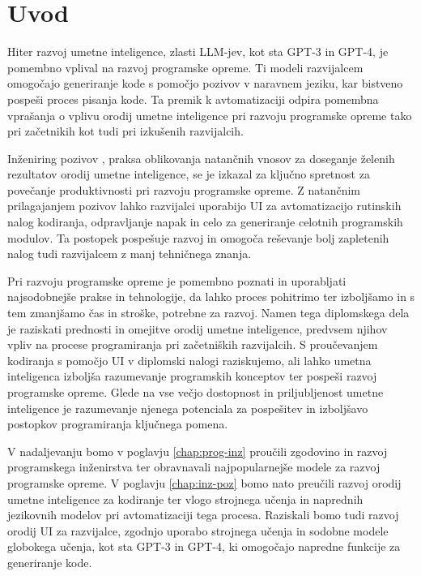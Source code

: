 \documentclass[a4paper,12pt,openright]{book}
\begin{document}
\chapter{Uvod}

Hiter razvoj umetne inteligence, zlasti LLM-jev, kot sta GPT-3 in GPT-4, je pomembno vplival na razvoj programske opreme. Ti modeli razvijalcem omogočajo generiranje kode s pomočjo pozivov v naravnem jeziku, kar bistveno pospeši proces pisanja kode. Ta premik k avtomatizaciji odpira pomembna vprašanja o vplivu orodij umetne inteligence pri razvoju programske opreme tako pri začetnikih kot tudi pri izkušenih razvijalcih.


Inženiring pozivov \cite{baidoo2023education}, praksa oblikovanja natančnih vnosov za doseganje želenih rezultatov orodij umetne inteligence, se je izkazal za ključno spretnost za povečanje produktivnosti pri razvoju programske opreme. Z natančnim prilagajanjem pozivov lahko razvijalci uporabijo UI za avtomatizacijo rutinskih nalog kodiranja, odpravljanje napak in celo za generiranje celotnih programskih modulov. Ta postopek pospešuje razvoj in omogoča reševanje bolj zapletenih nalog tudi razvijalcem z manj tehničnega znanja.

Pri razvoju programske opreme je pomembno poznati in uporabljati najsodobnejše prakse in tehnologije, da lahko proces pohitrimo ter izboljšamo in s tem zmanjšamo čas in stroške, potrebne za razvoj.
Namen tega diplomskega dela je raziskati prednosti in omejitve orodij umetne inteligence, predvsem njihov vpliv na procese programiranja  pri začetniških razvijalcih. S proučevanjem kodiranja s pomočjo UI v diplomski nalogi raziskujemo, ali lahko umetna inteligenca izboljša razumevanje programskih konceptov ter pospeši razvoj programske opreme. Glede na vse večjo dostopnost in priljubljenost umetne inteligence je razumevanje njenega potenciala za pospešitev in izboljšavo postopkov programiranja ključnega pomena.

V nadaljevanju bomo v poglavju \ref{chap:prog-inz} proučili zgodovino in razvoj programskega inženirstva ter obravnavali najpopularnejše modele za razvoj programske opreme. V poglavju \ref{chap:inz-poz} bomo nato preučili razvoj orodij umetne inteligence za kodiranje ter vlogo strojnega učenja in naprednih jezikovnih modelov pri avtomatizaciji tega procesa. Raziskali bomo tudi razvoj orodij UI za razvijalce, zgodnjo uporabo strojnega učenja in sodobne modele globokega učenja, kot sta GPT-3 in GPT-4, ki omogočajo napredne funkcije za generiranje kode.
\end{document}
